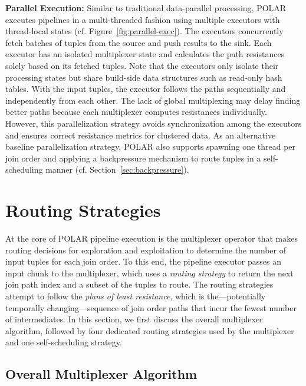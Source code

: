 \textbf{Parallel Execution:} Similar to traditional data-parallel processing, POLAR executes pipelines in a multi-threaded fashion using multiple executors with thread-local states (cf. Figure~\ref{fig:parallel-exec}). The executors concurrently fetch batches of tuples from the source and push results to the sink. Each executor has an isolated multiplexer state and calculates the path resistances solely based on its fetched tuples. Note that the executors only isolate their processing states but share build-side data structures such as read-only hash tables. With the input tuples, the executor follows the paths sequentially and independently from each other. The lack of global multiplexing may delay finding better paths because each multiplexer computes resistances individually. However, this parallelization strategy avoids synchronization among the executors and ensures correct resistance metrics for clustered data. As an alternative baseline parallelization strategy, POLAR also supports spawning one thread per join order and applying a backpressure mechanism to route tuples in a self-scheduling manner (cf. Section~\ref{sec:backpressure}).




\section{Routing Strategies}
\label{sec:routing_strategies}

At the core of POLAR pipeline execution is the multiplexer operator that makes routing decisions for exploration and exploitation to determine the number of input tuples for each join order. To this end, the pipeline executor passes an input chunk to the multiplexer, which uses a \emph{routing strategy} to return the next join path index and a subset of the tuples to route. The routing strategies attempt to follow the \emph{plans of least resistance}, which is the---potentially temporally changing---sequence of join order paths that incur the fewest number of intermediates. In this section, we first discuss the overall multiplexer algorithm, followed by four dedicated routing strategies used by the multiplexer and one self-scheduling strategy.

\subsection{Overall Multiplexer Algorithm}
\label{sec:multiplexer}

